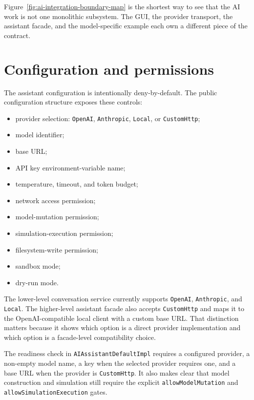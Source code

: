 Figure~\ref{fig:ai-integration-boundary-map} is the shortest way to see that the AI work is not one monolithic subsystem. The GUI, the provider transport, the assistant facade, and the model-specific example each own a different piece of the contract.

\section{Configuration and permissions}
\label{sec:ai-configuration}

The assistant configuration is intentionally deny-by-default. The public configuration structure exposes these controls:
\begin{itemize}
\item provider selection: \texttt{OpenAI}, \texttt{Anthropic}, \texttt{Local}, or \texttt{CustomHttp};
\item model identifier;
\item base URL;
\item API key environment-variable name;
\item temperature, timeout, and token budget;
\item network access permission;
\item model-mutation permission;
\item simulation-execution permission;
\item filesystem-write permission;
\item sandbox mode;
\item dry-run mode.
\end{itemize}

The lower-level conversation service currently supports \texttt{OpenAI}, \texttt{Anthropic}, and \texttt{Local}. The higher-level assistant facade also accepts \texttt{CustomHttp} and maps it to the OpenAI-compatible local client with a custom base URL. That distinction matters because it shows which option is a direct provider implementation and which option is a facade-level compatibility choice.

The readiness check in \texttt{AIAssistantDefaultImpl} requires a configured provider, a non-empty model name, a key when the selected provider requires one, and a base URL when the provider is \texttt{CustomHttp}. It also makes clear that model construction and simulation still require the explicit \texttt{allowModelMutation} and \texttt{allowSimulationExecution} gates.


